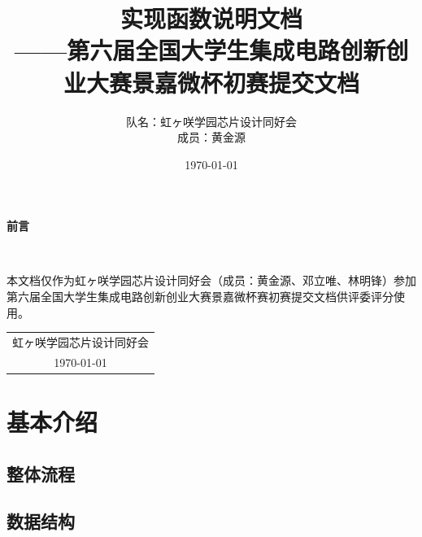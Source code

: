 \documentclass[12pt, a4paper, oneside]{ctexbook}
\title{{\Huge{\textbf{实现函数说明文档}}}\normalsize{\\——第六届全国大学生集成电路创新创业大赛景嘉微杯初赛提交文档}}
\author{队名：虹ヶ咲学园芯片设计同好会\\ 成员：黄金源\space邓立唯\space林明锋}
\date{\today}
\begin{document}
	\maketitle	
	\setcounter{page}{1}
	\begin{center}
		\Huge\textbf{前言}
	\end{center}~\

本文档仅作为虹ヶ咲学园芯片设计同好会（成员：黄金源、邓立唯、林明锋）参加第六届全国大学生集成电路创新创业大赛景嘉微杯赛初赛提交文档供评委评分使用。
	~\\
	\begin{flushright}
		\begin{tabular}{c}
			虹ヶ咲学园芯片设计同好会\\
			\today
		\end{tabular}
	\end{flushright}
	\newpage
	\setcounter{page}{1}
	\tableofcontents
	\newpage
	\setcounter{page}{1}
	
	\chapter{基本介绍}
	\section{整体流程}
	\section{数据结构}
\end{document}
